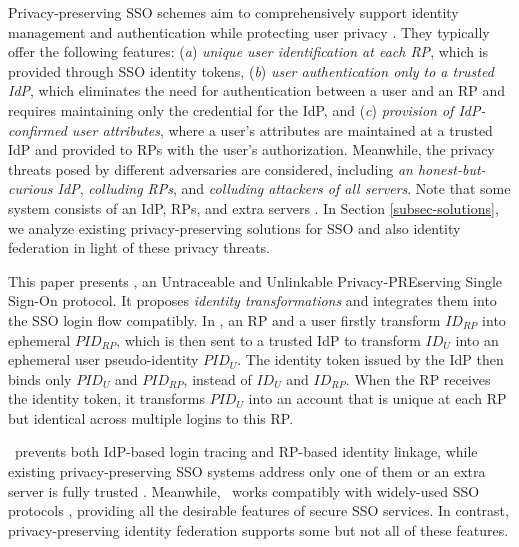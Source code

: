 Privacy-preserving SSO schemes aim to comprehensively support identity management and authentication while protecting user privacy \cite{maler2008venn, NIST2017draft, BrowserID, SPRESSO}.
They typically offer the following features:
(\emph{a}) \emph{unique user identification at each RP}, which is provided through SSO identity tokens,
(\emph{b}) \emph{user authentication only to a trusted IdP},
which eliminates the need for authentication between a user and an RP and requires maintaining only the credential for the IdP,
and (\emph{c}) \emph{provision of IdP-confirmed user attributes},
 where a user's attributes are maintained at a trusted IdP and provided to RPs with the user's authorization.
Meanwhile, the privacy threats posed by different adversaries are considered, including \emph{an honest-but-curious IdP}, \emph{colluding RPs}, and \emph{colluding attackers of all servers}.
Note that some system consists of an IdP, RPs, and extra servers \cite{SPRESSO,PseudoID,miso}.
In Section \ref{subsec-solutions}, we analyze existing privacy-preserving solutions for SSO and also identity federation in light of these privacy threats.


This paper presents \usso, an Untraceable and Unlinkable Privacy-PREserving Single Sign-On protocol.
It proposes {\em identity transformations} and integrates them into the SSO login flow compatibly.
In \usso, an RP and a user firstly transform $ID_{RP}$ into ephemeral $PID_{RP}$, which is then sent to a trusted IdP to transform $ID_U$ into an ephemeral user pseudo-identity $PID_U$.
The identity token issued by the IdP then binds only $PID_U$ and $PID_{RP}$, instead of $ID_U$ and $ID_{RP}$. When the RP receives the identity token, %
 it transforms $PID_U$ into an account that is unique at each RP but identical across multiple logins to this RP.


\usso\ prevents both IdP-based login tracing and RP-based identity linkage, while existing privacy-preserving SSO systems address only one of them \cite{BrowserID, SPRESSO, NIST2017draft, FirefoxAccount,save-flow} or an extra server is fully trusted \cite{miso}.
Meanwhile, \usso\ works compatibly with widely-used SSO protocols \cite{OpenIDConnect, rfc6749, SAML, NIST2017draft}, providing all the desirable features of secure SSO services.
In contrast, privacy-preserving identity federation \cite{PseudoID, ELPASSO, UnlimitID, Opaak, uprov, hyperledge-idemix} supports some but not all of these features.

